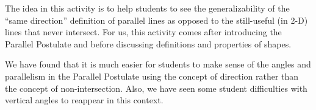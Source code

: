 \documentclass{ximera}
\begin{document}
\newpage

\begin{instructorNotes}
The idea in this activity is to help students to see the generalizability of the ``same direction'' definition of parallel lines as opposed to the still-useful (in 2-D) lines that never intersect.  For us, this activity comes after introducing the Parallel Postulate and before discussing definitions and properties of shapes.

We have found that it is much easier for students to make sense of the angles and parallelism in the Parallel Postulate using the concept of direction rather than the concept of non-intersection.  Also, we have seen some student difficulties with vertical angles to reappear in this context.

\end{instructorNotes}
\end{document}
